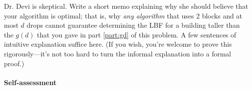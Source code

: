 \documentclass{ks-pset}
\begin{document}
\begin{problem}[Pasadenium!, 60]
\begin{subproblems}
    \item Dr. Devi is skeptical.  Write a short memo explaining why she should
      believe that your algorithm is optimal; that is, why \emph{any algorithm}
      that uses 2 blocks and at most \(d\) drops cannot guarantee determining
      the LBF for a building taller than the \(g(d)\) that you gave in part
      \ref{part:gd} of this problem.  A few sentences of intuitive explanation
      suffice here.  (If you wish, you're welcome to prove this
      rigorously---it's not too hard to turn the informal explanation into a
      formal proof.)

	\end{subproblems}

\end{problem}

\begin{solution}

  \begin{subproblems}

    \item

    \item

    \item

  \end{subproblems}

  \paragraph{Self-assessment}
\end{solution}
\end{document}
